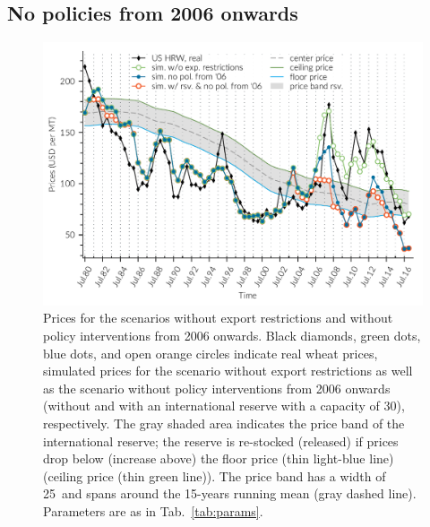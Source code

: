 
\subsection{No policies from 2006 onwards}
\begin{figure}[htbp]
\centering  \includegraphics[width=.8\textwidth]{plots/no_policies_after_2006/pric1980_2017}
\caption{Prices for the scenarios without export restrictions and without policy interventions from
  2006 onwards. Black diamonds, green dots, blue dots, and open orange circles indicate real wheat
  prices, simulated prices for the scenario without export restrictions as well as the scenario
  without policy interventions from 2006 onwards (without and with an international reserve with a
  capacity of 30\mmt), respectively. The gray shaded area indicates the price band of the
  international reserve; the reserve is re-stocked (released) if prices drop below (increase above)
  the floor price (thin light-blue line) (ceiling price (thin green line)). The price band has a width of 25\USD~and spans around the 15-years running mean (gray dashed line). Parameters are as in Tab.~\ref{tab:params}.}
  \label{fig:prices_small_res}
\end{figure}
